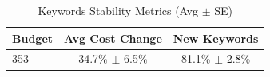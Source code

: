 \begin{table}[htbp]
\centering
\caption{Keywords Stability Metrics (Avg $\pm$ SE)}
\begin{tabular}{lcc}
\toprule
Budget & Avg Cost Change & New Keywords \\
\midrule
353 & 34.7\% $\pm$ 6.5\% & 81.1\% $\pm$ 2.8\% \\
\bottomrule
\end{tabular}
\end{table}